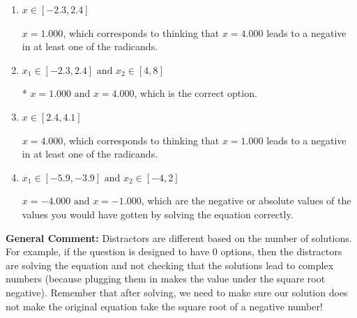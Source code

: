 \documentclass{extbook}[14pt]
\begin{document}
\begin{enumerate}
{\begin{enumerate}[label=\Alph*.]
Corresponds to thinking that $x = 1.000 \text{ and } x = 4.000$ lead to negatives in at least one of the radicands.
\item \( x \in [-2.3,2.4] \)

$x = 1.000$, which corresponds to thinking that $x = 4.000$ leads to a negative in at least one of the radicands.
\item \( x_1 \in [-2.3, 2.4] \text{ and } x_2 \in [4,8] \)

* $x = 1.000 \text{ and } x = 4.000$, which is the correct option.
\item \( x \in [2.4,4.1] \)

$x = 4.000$, which corresponds to thinking that $x = 1.000$ leads to a negative in at least one of the radicands.
\item \( x_1 \in [-5.9, -3.9] \text{ and } x_2 \in [-4,2] \)

$x = -4.000 \text{ and } x = -1.000$, which are the negative or absolute values of the values you would have gotten by solving the equation correctly.
\end{enumerate}

\textbf{General Comment:} Distractors are different based on the number of solutions. For example, if the question is designed to have 0 options, then the distractors are solving the equation and not checking that the solutions lead to complex numbers (because plugging them in makes the value under the square root negative). Remember that after solving, we need to make sure our solution does not make the original equation take the square root of a negative number!
}
\end{enumerate}
\end{document}
